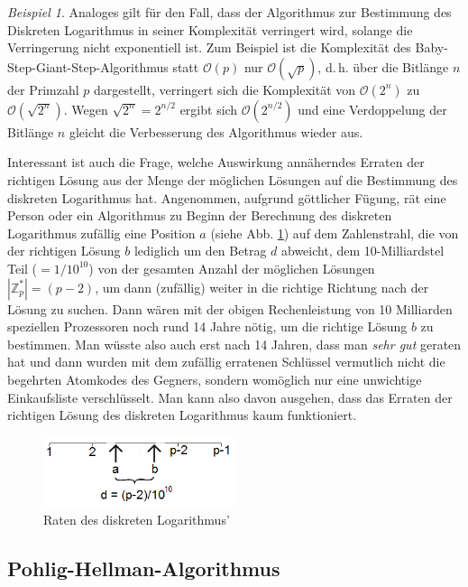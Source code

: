 \documentclass[
  a4paper,
  11pt,
]{scrartcl}
\theoremstyle{plain}
\theoremstyle{definition}
\theoremstyle{remark}
\newtheorem{beispiel}{Beispiel}
\newcommand{\Z}{\mathbb{Z}}
\begin{document}
\begin{beispiel}
  Analoges gilt für den Fall, dass der Algorithmus zur Bestimmung des Diskreten
  Logarithmus in seiner Komplexität verringert wird, solange die Verringerung
  nicht exponentiell ist. Zum Beispiel ist die Komplexität des
  Baby-Step-Giant-Step-Algorithmus statt $\mathcal{O}(p)$ nur
  $\mathcal{O}(\sqrt{p})$, d.\,h. über die Bitlänge $n$ der Primzahl $p$
  dargestellt, verringert sich die Komplexität von $\mathcal{O}(2^n)$ zu
  $\mathcal{O}(\sqrt{2^n})$. Wegen $\sqrt{2^n} = 2^{n/2}$ ergibt sich
  $\mathcal{O}(2^{n/2})$ und eine Verdoppelung der Bitlänge $n$ gleicht die
  Verbesserung des Algorithmus wieder aus.

  Interessant ist auch die Frage, welche Auswirkung annäherndes Erraten der
  richtigen Lösung aus der Menge der möglichen Lösungen auf die Bestimmung des
  diskreten Logarithmus hat. Angenommen, aufgrund göttlicher Fügung, rät eine
  Person oder ein Algorithmus zu Beginn der Berechnung des diskreten Logarithmus
  zufällig eine Position $a$ (siehe Abb. \ref{fig:logRaten}) auf dem Zahlenstrahl, die von der richtigen Lösung
  $b$ lediglich um den Betrag $d$ abweicht, dem 10-Milliardstel Teil ($=
  1/10^{10}$) von der gesamten Anzahl der möglichen Lösungen $\left| \Z_p^*
  \right| = (p-2)$, um dann (zufällig) weiter in die richtige Richtung nach der
  Lösung zu suchen. Dann wären mit der obigen Rechenleistung von 10 Milliarden
  speziellen Prozessoren noch rund 14 Jahre nötig, um die richtige Lösung $b$ zu
  bestimmen. Man wüsste also auch erst nach 14 Jahren, dass man \emph{sehr gut}
  geraten hat und dann wurden mit dem zufällig erratenen Schlüssel vermutlich
  nicht die begehrten Atomkodes des Gegners, sondern womöglich nur eine
  unwichtige Einkaufsliste verschlüsselt. Man kann also davon ausgehen, dass das
  Erraten der richtigen Lösung des diskreten Logarithmus kaum funktioniert.

  \begin{figure}[H]
    \centering
    \includegraphics[width=0.5\textwidth]{logRaten.png}
    \caption{Raten des diskreten Logarithmus’}
    \label{fig:logRaten}
  \end{figure}
\end{beispiel}

\subsection{Pohlig-Hellman-Algorithmus}
\label{sub:pohlig_hellman_algorithmus}
\end{document}
